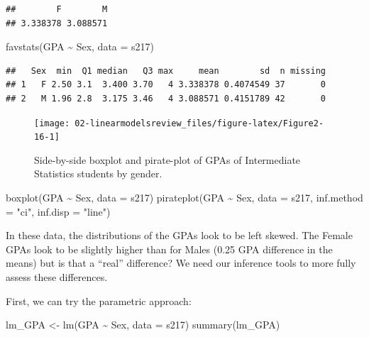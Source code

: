 \documentclass[
]{book}
\newenvironment{Shaded}{\begin{snugshade}}{\end{snugshade}}
\newcommand{\AttributeTok}[1]{\textcolor[rgb]{0.77,0.63,0.00}{#1}}
\newcommand{\FunctionTok}[1]{\textcolor[rgb]{0.00,0.00,0.00}{#1}}
\newcommand{\NormalTok}[1]{#1}
\newcommand{\OtherTok}[1]{\textcolor[rgb]{0.56,0.35,0.01}{#1}}
\newcommand{\SpecialCharTok}[1]{\textcolor[rgb]{0.00,0.00,0.00}{#1}}
\newcommand{\StringTok}[1]{\textcolor[rgb]{0.31,0.60,0.02}{#1}}
\begin{document}
\begin{verbatim}
##        F        M 
## 3.338378 3.088571
\end{verbatim}

\begin{Shaded}
\begin{Highlighting}[]
\FunctionTok{favstats}\NormalTok{(GPA }\SpecialCharTok{\textasciitilde{}}\NormalTok{ Sex, }\AttributeTok{data =}\NormalTok{ s217)}
\end{Highlighting}
\end{Shaded}

\begin{verbatim}
##   Sex  min  Q1 median   Q3 max     mean        sd  n missing
## 1   F 2.50 3.1  3.400 3.70   4 3.338378 0.4074549 37       0
## 2   M 1.96 2.8  3.175 3.46   4 3.088571 0.4151789 42       0
\end{verbatim}



\begin{figure}[ht!]

{\centering \texttt{[image: 02-linearmodelsreview\_files/figure-latex/Figure2-16-1]} 

}

\caption{Side-by-side boxplot and pirate-plot of GPAs of Intermediate Statistics students by gender.}\label{fig:Figure2-16}
\end{figure}

\begin{Shaded}
\begin{Highlighting}[]
\FunctionTok{boxplot}\NormalTok{(GPA }\SpecialCharTok{\textasciitilde{}}\NormalTok{ Sex, }\AttributeTok{data =}\NormalTok{ s217)}
\FunctionTok{pirateplot}\NormalTok{(GPA }\SpecialCharTok{\textasciitilde{}}\NormalTok{ Sex, }\AttributeTok{data =}\NormalTok{ s217, }\AttributeTok{inf.method =} \StringTok{"ci"}\NormalTok{, }\AttributeTok{inf.disp =} \StringTok{"line"}\NormalTok{)}
\end{Highlighting}
\end{Shaded}

In these data, the distributions of the GPAs look to be left skewed. The
Female GPAs look to be slightly higher than for Males (0.25 GPA difference in the
means) but is that a ``real'' difference? We need our inference tools to more fully
assess these differences.

\indent First, we can try the parametric approach:

\begin{Shaded}
\begin{Highlighting}[]
\NormalTok{lm\_GPA }\OtherTok{\textless{}{-}} \FunctionTok{lm}\NormalTok{(GPA }\SpecialCharTok{\textasciitilde{}}\NormalTok{ Sex, }\AttributeTok{data =}\NormalTok{ s217)}
\FunctionTok{summary}\NormalTok{(lm\_GPA)}
\end{Highlighting}
\end{Shaded}
\end{document}
